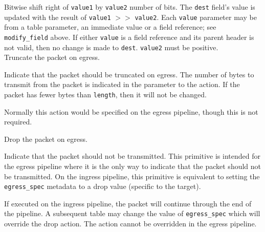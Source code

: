\documentclass[12pt]{article}
\begin{document}

{ %
Bitwise shift right of \texttt{value1} by \texttt{value2} number of bits.
}
{ %
}
{ %
The \texttt{dest} field's value is updated with the result of 
\texttt{value1} $>>$ \texttt{value2}. Each \texttt{value} parameter may be from a
table parameter, an immediate value or a field reference; see \texttt{modify_field} above. If either \texttt{value}
is a field reference and its parent header is not valid, then no
change is made to \texttt{dest}. \texttt{value2} must be positive. 
}\\


{ %
Truncate the packet on egress.
}
{ %
}
{ %
Indicate that the packet should be truncated on egress.  The number of bytes 
to transmit from the packet is indicated in the parameter to the action.  If 
the packet has fewer bytes than \texttt{length}, then it will not be changed.

Normally this action would be specified on the egress pipeline, though this 
is not required.
}


{ %
Drop the packet on egress.
}
{ %
}
{ %
Indicate that the packet should not be transmitted. This primitive is intended 
for the egress pipeline where it is the only way to indicate that the packet 
should not be transmitted. On the ingress pipeline, this primitive is equivalent 
to setting the \texttt{egress_spec} metadata to a drop value (specific to the target). 


If executed on the ingress pipeline, the packet will continue through the 
end of the pipeline. A subsequent table may change the value of \texttt{egress_spec} which 
will override the drop action. The action cannot be overridden in the egress 
pipeline.
}

\end{document}
